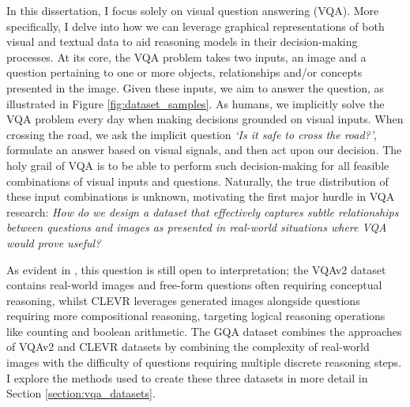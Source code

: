 In this dissertation, I focus solely on visual question answering (VQA). More specifically, I delve into how we can leverage graphical representations of both visual and textual data to aid reasoning models in their decision-making processes. At its core, the VQA problem takes two inputs, an image and a question pertaining to one or more objects, relationships and/or concepts presented in the image. Given these inputs, we aim to answer the question, as illustrated in Figure \ref{fig:dataset_samples}. As humans, we implicitly solve the VQA problem every day when making decisions grounded on visual inputs. When crossing the road, we ask the implicit question \textit{`Is it safe to cross the road?'}, formulate an answer based on visual signals, and then act upon our decision. The holy grail of VQA is to be able to perform such decision-making for all feasible combinations of visual inputs and questions. Naturally, the true distribution of these input combinations is unknown, motivating the first major hurdle in VQA research: \textit{How do we design a dataset that effectively captures subtle relationships between questions and images as presented in real-world situations where VQA would prove useful?} 

As evident in \figureautorefname{ \ref{fig:dataset_samples}}, this question is still open to interpretation; the VQAv2 dataset contains real-world images and free-form questions often requiring conceptual reasoning, whilst CLEVR leverages generated images alongside questions requiring more compositional reasoning, targeting logical reasoning operations like counting and boolean arithmetic. The GQA dataset combines the approaches of VQAv2 and CLEVR datasets by combining the complexity of real-world images with the difficulty of questions requiring multiple discrete reasoning steps. I explore the methods used to create these three datasets in more detail in Section \ref{section:vqa_datasets}.

